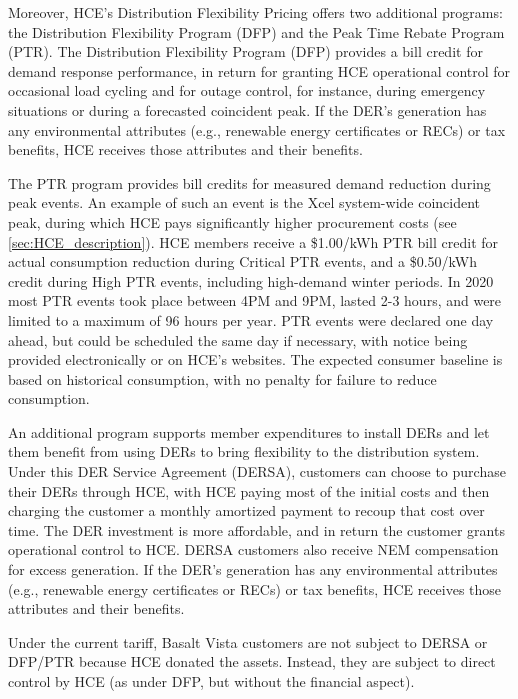 Moreover, HCE's Distribution Flexibility Pricing offers two additional programs: the Distribution Flexibility Program (DFP) and the Peak Time Rebate Program (PTR). The Distribution Flexibility Program (DFP) provides a bill credit for demand response performance, in return for granting HCE operational control for occasional load cycling and for outage control, for instance, during emergency situations or during a forecasted coincident peak. If the DER's generation has any environmental attributes (e.g., renewable energy certificates or RECs) or tax benefits, HCE receives those attributes and their benefits.

The PTR program provides bill credits for measured demand reduction during peak events. An example of such an event is the Xcel system-wide coincident peak, during which HCE pays significantly higher procurement costs (see \cref{sec:HCE_description}). HCE members receive a \$1.00/kWh PTR bill credit for actual consumption reduction during Critical PTR events, and a \$0.50/kWh credit during High PTR events, including high-demand winter periods. In 2020 most PTR events took place between 4PM and 9PM, lasted 2-3 hours, and were limited to a maximum of 96 hours per year. PTR events were declared one day ahead, but could be scheduled the same day if necessary, with notice being provided electronically or on HCE's websites. The expected consumer baseline is based on historical consumption, with no penalty for failure to reduce consumption.

An additional program supports member expenditures to install DERs and let them benefit from using DERs to bring flexibility to the distribution system. Under this DER Service Agreement (DERSA), customers can choose to purchase their DERs through HCE, with HCE paying most of the initial costs and then charging the customer a monthly amortized payment to recoup that cost over time. The DER investment is more affordable, and in return the customer grants operational control to HCE. DERSA customers also receive NEM compensation for excess generation. If the DER's generation has any environmental attributes (e.g., renewable energy certificates or RECs) or tax benefits, HCE receives those attributes and their benefits. 

Under the current tariff, Basalt Vista customers are not subject to DERSA or DFP/PTR because HCE donated the assets. Instead, they are subject to direct control by HCE (as under DFP, but without the financial aspect). 







